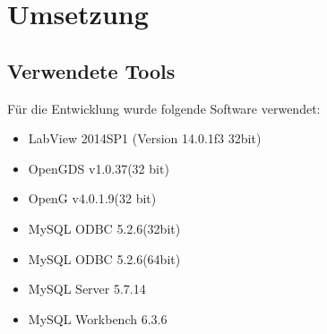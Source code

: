 \documentclass[10pt]{scrartcl}
\begin{document}
\section{Umsetzung}
\subsection{Verwendete Tools}
Für die Entwicklung wurde folgende Software verwendet:
\begin{itemize}
	\item LabView 2014SP1 (Version 14.0.1f3 32bit)
	\item OpenGDS v1.0.37(32 bit)
	\item OpenG v4.0.1.9(32 bit)
	\item MySQL ODBC 5.2.6(32bit)
	\item MySQL ODBC 5.2.6(64bit)
	\item MySQL Server 5.7.14
	\item MySQL Workbench 6.3.6
\end{itemize}
\end{document}

